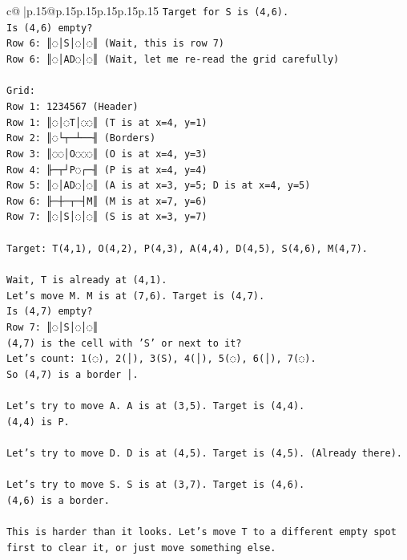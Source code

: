 \documentclass{article}
\begin{document}
{\begin{supertabular}{c@{$\;$}|p{.15\linewidth}@{}p{.15\linewidth}p{.15\linewidth}p{.15\linewidth}p{.15\linewidth}p{.15\linewidth}}
{{{\texttt{Target for S is (4,6).} \\
\texttt{Is (4,6) empty?} \\
\texttt{Row 6: ║◌│S│◌│◌║ (Wait, this is row 7)} \\
\texttt{Row 6: ║◌│AD◌│◌║ (Wait, let me re{-}read the grid carefully)} \\
\\ 
\texttt{Grid:} \\
\texttt{Row 1: 1234567 (Header)} \\
\texttt{Row 1: ║◌│◌T│◌◌║ (T is at x=4, y=1)} \\
\texttt{Row 2: ║◌└┬─┴──╢ (Borders)} \\
\texttt{Row 3: ║◌◌│O◌◌◌║ (O is at x=4, y=3)} \\
\texttt{Row 4: ╟─┬┘P◌┌─╢ (P is at x=4, y=4)} \\
\texttt{Row 5: ║◌│AD◌│◌║ (A is at x=3, y=5; D is at x=4, y=5)} \\
\texttt{Row 6: ╟─┼─┬─┤M║ (M is at x=7, y=6)} \\
\texttt{Row 7: ║◌│S│◌│◌║ (S is at x=3, y=7)} \\
\\ 
\texttt{Target: T(4,1), O(4,2), P(4,3), A(4,4), D(4,5), S(4,6), M(4,7).} \\
\\ 
\texttt{Wait, T is already at (4,1).} \\
\texttt{Let's move M. M is at (7,6). Target is (4,7).} \\
\texttt{Is (4,7) empty?} \\
\texttt{Row 7: ║◌│S│◌│◌║} \\
\texttt{(4,7) is the cell with 'S' or next to it?} \\
\texttt{Let's count: 1(◌), 2(│), 3(S), 4(│), 5(◌), 6(│), 7(◌).} \\
\texttt{So (4,7) is a border │.} \\
\\ 
\texttt{Let's try to move A. A is at (3,5). Target is (4,4).} \\
\texttt{(4,4) is P.} \\
\\ 
\texttt{Let's try to move D. D is at (4,5). Target is (4,5). (Already there).} \\
\\ 
\texttt{Let's try to move S. S is at (3,7). Target is (4,6).} \\
\texttt{(4,6) is a border.} \\
\\ 
\texttt{This is harder than it looks. Let's move T to a different empty spot first to clear it, or just move something else.} \\
}}}
\end{supertabular}}
\end{document}
